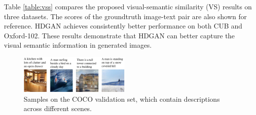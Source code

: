 \documentclass[10pt,twocolumn,letterpaper]{article}
\begin{document}
Table \ref{table:vss} compares the proposed visual-semantic similarity (VS) results on three datasets. The scores of the groundtruth image-text pair are also shown for reference.  HDGAN achieves consistently better performance on both CUB and Oxford-102. These results demonstrate that HDGAN can better capture the visual semantic information in generated images. 

\begin{figure}[t]
	\centering
	\includegraphics[width=0.48\textwidth]{figure/coco2.pdf}
	\vspace{-.6cm}
	\caption{Samples on the COCO validation set, which contain descriptions across different scenes. } \label{fig:coco}
	\vspace{-.7cm}
\end{figure}



\end{document}
